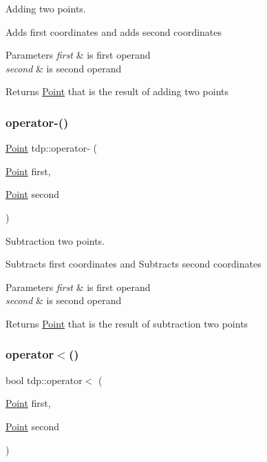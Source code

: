 Adding two points. 

Adds first coordinates and adds second coordinates 
\begin{DoxyParams}{Parameters}
{\em first} & is first operand \\
\hline
{\em second} & is second operand \\
\hline
\end{DoxyParams}
\begin{DoxyReturn}{Returns}
\mbox{\hyperlink{structtdp_1_1_point}{Point}} that is the result of adding two points 
\end{DoxyReturn}
\mbox{\label{namespacetdp_ab8dc4a4b6272d3a8ef06f22a5b07daec}} 
\subsubsection{\texorpdfstring{operator-\/()}{operator-()}}
{\footnotesize\ttfamily \mbox{\hyperlink{structtdp_1_1_point}{Point}} tdp\+::operator-\/ (\begin{DoxyParamCaption}\item[{\mbox{\hyperlink{structtdp_1_1_point}{Point}}}]{first,  }\item[{\mbox{\hyperlink{structtdp_1_1_point}{Point}}}]{second }\end{DoxyParamCaption})}



Subtraction two points. 

Subtracts first coordinates and Subtracts second coordinates 
\begin{DoxyParams}{Parameters}
{\em first} & is first operand \\
\hline
{\em second} & is second operand \\
\hline
\end{DoxyParams}
\begin{DoxyReturn}{Returns}
\mbox{\hyperlink{structtdp_1_1_point}{Point}} that is the result of subtraction two points 
\end{DoxyReturn}
\mbox{\label{namespacetdp_aa76700935906dbb491a443a4662d758f}} 
\subsubsection{\texorpdfstring{operator$<$()}{operator<()}}
{\footnotesize\ttfamily bool tdp\+::operator$<$ (\begin{DoxyParamCaption}\item[{\mbox{\hyperlink{structtdp_1_1_point}{Point}}}]{first,  }\item[{\mbox{\hyperlink{structtdp_1_1_point}{Point}}}]{second }\end{DoxyParamCaption})}



